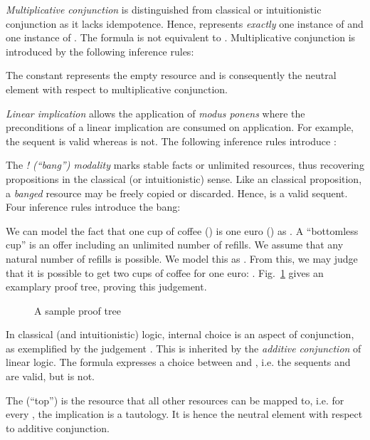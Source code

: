 \documentclass[acmtocl]{acmtrans2m}
\begin{document}
\emph{Multiplicative conjunction} is distinguished from classical or
intuitionistic conjunction as it lacks idempotence. Hence, 
represents \emph{exactly} one instance of  and one instance of .
The formula  is not equivalent to . Multiplicative
conjunction is introduced by the following inference rules:



The constant  represents the empty resource and is consequently the
neutral element with respect to multiplicative conjunction.



\emph{Linear implication } allows the application of \emph{modus ponens}
where the preconditions of a linear implication are consumed on application. For
example, the sequent  is valid whereas
 is not. The following inference
rules introduce :



The \textit{! (``bang'') modality} marks stable facts or unlimited resources,
thus recovering propositions in the classical (or intuitionistic) sense. Like an
classical proposition, a \emph{banged} resource may be freely copied or
discarded. Hence,  is a
valid sequent. Four inference rules introduce the bang:




\begin{example}
We can model the fact that one cup of coffee () is one euro () as . A ``bottomless cup'' is an offer including an unlimited number of refills.
We assume that any natural number of refills is possible. We model this as
. From this, we may judge that it is possible to get two cups of
coffee for one euro: .
Fig.~\ref{fig:coffee-example} gives an examplary proof tree, proving this
judgement.

\begin{figure}
\label{fig:coffee-example}
\begin{center}

\end{center}
\caption{A sample proof tree}
\end{figure}
\end{example}

In classical (and intuitionistic) logic, internal choice is an aspect of
conjunction, as exemplified by the judgement .
This is inherited by the \textit{additive conjunction } of linear logic. The
formula  expresses a choice between  and , i.e. the
sequents  and  are valid,
but  is not.



The  (``top'') is the resource that all other resources can be mapped to,
i.e. for every , the implication  is a tautology. It is
hence the neutral element with respect to additive conjunction.
\end{document}
